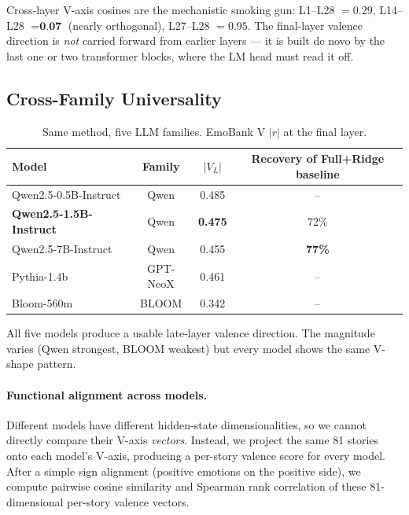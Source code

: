 Cross-layer V-axis cosines are the mechanistic smoking gun: L1--L28
$= 0.29$, L14--L28 $= \textbf{0.07}$ (nearly orthogonal), L27--L28
$= 0.95$. The final-layer valence direction is \emph{not} carried
forward from earlier layers --- it is built de novo by the last one
or two transformer blocks, where the LM head must read it off.

\subsection{Cross-Family Universality}

\begin{table}[h]
\centering
\caption{Same method, five LLM families. EmoBank V $|r|$ at the final layer.}
\label{tab:crossmodel}
\begin{tabular}{lccc}
\toprule
Model & Family & $|V_L|$ & Recovery of Full+Ridge baseline \\
\midrule
Qwen2.5-0.5B-Instruct & Qwen & 0.485 & -- \\
\textbf{Qwen2.5-1.5B-Instruct} & Qwen & \textbf{0.475} & 72\% \\
Qwen2.5-7B-Instruct & Qwen & 0.455 & \textbf{77\%} \\
\midrule
Pythia-1.4b & GPT-NeoX & 0.461 & -- \\
Bloom-560m & BLOOM & 0.342 & -- \\
\bottomrule
\end{tabular}
\end{table}

All five models produce a usable late-layer valence direction. The
magnitude varies (Qwen strongest, BLOOM weakest) but every model shows the
same V-shape pattern.

\paragraph{Functional alignment across models.}
Different models have different hidden-state dimensionalities, so we
cannot directly compare their V-axis \emph{vectors}. Instead, we
project the same 81 stories onto each model's V-axis, producing a
per-story valence score for every model. After a simple sign alignment
(positive emotions on the positive side), we compute pairwise cosine
similarity and Spearman rank correlation of these 81-dimensional
per-story valence vectors.

